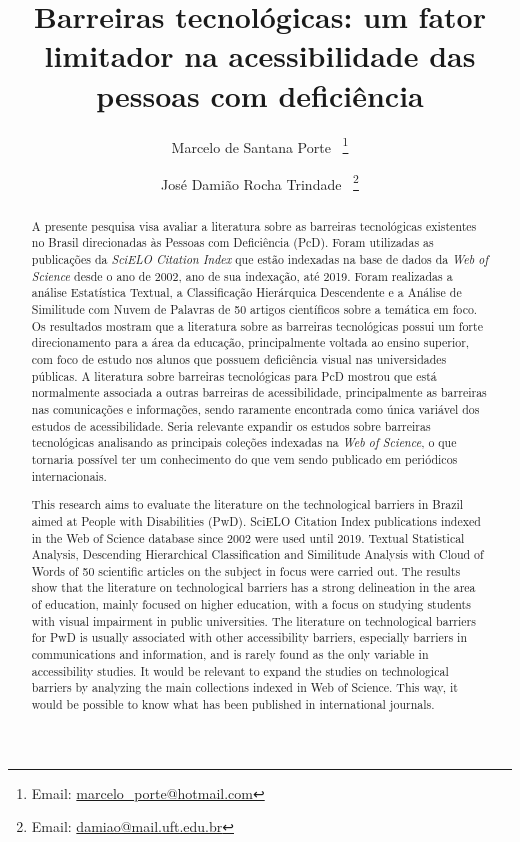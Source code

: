 \documentclass{textolivre}
\title{Barreiras tecnológicas: um fator limitador na acessibilidade das pessoas com deficiência}
\author[1]{Marcelo de Santana Porte~\orcid{0000-0002-7271-6476} \thanks{Email: \url{marcelo_porte@hotmail.com}}}
\author[2]{José Damião Rocha Trindade~\orcid{0000-0002-5788-7517} \thanks{Email: \url{damiao@mail.uft.edu.br}}}
\affil[1]{Universidade Federal do Sul e Sudeste do Pará, Faculdade de Ciências Contábeis, Rondon do Pará, Pará, Brasil.}
\affil[2]{Universidade Federal do Tocantins, Programa de Pós-Graduação em Educação, Palmas, Tocantins, Brasil.}
\begin{document}
\maketitle

\begin{polyabstract}
\begin{abstract}
A presente pesquisa visa avaliar a literatura sobre as barreiras tecnológicas existentes no Brasil direcionadas às Pessoas com Deficiência (PcD). Foram utilizadas as publicações da \emph{SciELO Citation Index} que estão indexadas na base de dados da \emph{Web of Science} desde o ano de 2002, ano de sua indexação, até 2019. Foram realizadas a análise Estatística Textual, a Classificação Hierárquica Descendente e a Análise de Similitude com Nuvem de Palavras de 50 artigos científicos sobre a temática em foco. Os resultados mostram que a literatura sobre as barreiras tecnológicas possui um forte direcionamento para a área da educação, principalmente voltada ao ensino superior, com foco de estudo nos alunos que possuem deficiência visual nas universidades públicas. A literatura sobre barreiras tecnológicas para PcD mostrou que está normalmente associada a outras barreiras de acessibilidade, principalmente as barreiras nas comunicações e informações, sendo raramente encontrada como única variável dos estudos de acessibilidade. Seria relevante expandir os estudos sobre barreiras tecnológicas analisando as principais coleções indexadas na \emph{Web of Science}, o que tornaria possível ter um conhecimento do que vem sendo publicado em periódicos internacionais.

\end{abstract}

\begin{english}
\begin{abstract}
This research aims to evaluate the literature on the technological barriers in Brazil aimed at People with Disabilities (PwD). SciELO Citation Index publications indexed in the Web of Science database since 2002 were used until 2019. Textual Statistical Analysis, Descending Hierarchical Classification and Similitude Analysis with Cloud of Words of 50 scientific articles on the subject in focus were carried out. The results show that the literature on technological barriers has a strong delineation in the area of education, mainly focused on higher education, with a focus on studying students with visual impairment in public universities. The literature on technological barriers for PwD is usually associated with other accessibility barriers, especially barriers in communications and information, and is rarely found as the only variable in accessibility studies. It would be relevant to expand the studies on technological barriers by analyzing the main collections indexed in Web of Science. This way, it would be possible to know what has been published in international journals.


\end{abstract}
\end{english}
\end{polyabstract}
\end{document}

